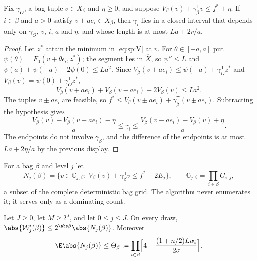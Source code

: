 \begin{lemma}\label{lem:sp:compare}
Fix $\gamma_O$, a bag tuple $v\in X_\beta$ and $\eta\ge0$, and suppose
$V_\beta(v)+\gamma_\beta^{\mathsf T}v\le f^*+\eta$. If $i\in\beta$ and
$a>0$ satisfy $v\pm ae_i\in X_\beta$, then $\gamma_i$ lies in a closed
interval that depends only on $\gamma_O$, $v$, $i$, $a$ and $\eta$, and whose
length is at most $La+2\eta/a$.
\end{lemma}

\begin{proof}
Let $z^*$ attain the minimum in \eqref{eq:sp:V} at $v$. For
$\theta\in[-a,a]$ put $\psi(\theta)=F_0(v+\theta e_i,z^*)$; the segment lies
in $\widehat X$, so $\psi''\le L$ and $\psi(a)+\psi(-a)-2\psi(0)\le La^2$.
Since $V_\beta(v\pm ae_i)\le\psi(\pm a)+\gamma_O^{\mathsf T}z^*$ and
$V_\beta(v)=\psi(0)+\gamma_O^{\mathsf T}z^*$,
\[
 V_\beta(v+ae_i)+V_\beta(v-ae_i)-2V_\beta(v)\le La^2 .
\]
The tuples $v\pm ae_i$ are feasible, so
$f^*\le V_\beta(v\pm ae_i)+\gamma_\beta^{\mathsf T}(v\pm ae_i)$. Subtracting
the hypothesis gives
\[
 \frac{V_\beta(v)-V_\beta(v+ae_i)-\eta}{a}\le\gamma_i\le
 \frac{V_\beta(v-ae_i)-V_\beta(v)+\eta}{a}.
\]
The endpoints do not involve $\gamma_\beta$, and the difference of the
endpoints is at most $La+2\eta/a$ by the previous display.
\end{proof}

For a bag $\beta$ and level $j$ let
\[
 N_j(\beta)=\bigl\{v\in\mathbb G_{j,\beta}:\
 V_\beta(v)+\gamma_\beta^{\mathsf T}v\le f^*+2E_j\bigr\},\qquad
 \mathbb G_{j,\beta}=\prod_{i\in\beta}G_{i,j},
\]
a subset of the complete deterministic bag grid. The algorithm never
enumerates it; it serves only as a dominating count.

\begin{proposition}\label{prop:sp:count}
Let $J\ge0$, let $M\ge2^J$, and let $0\le j\le J$. On every draw,
$\abs{\mathcal W'_j(\beta)}\le2^{\abs\beta}\abs{N_j(\beta)}$. Moreover
\begin{equation}\label{eq:sp:Theta}
 \E\abs{N_j(\beta)}\le\Theta_\beta:=\prod_{i\in\beta}
 \Bigl[4+\frac{(1+n/2)Lw_i}{2\sigma}\Bigr].
\end{equation}
\end{proposition}

